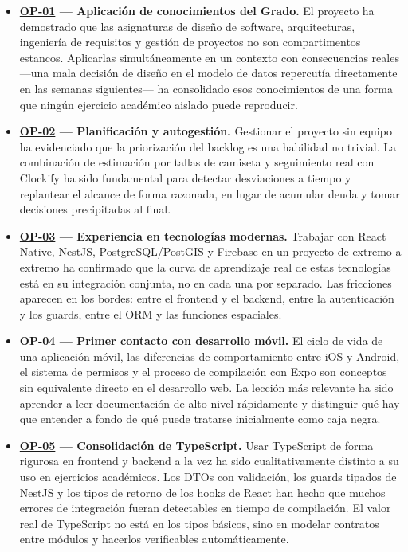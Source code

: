 \begin{itemize}
    \item \textbf{\hyperref[op:01]{OP-01} --- Aplicación de conocimientos del Grado.} El proyecto ha demostrado que las asignaturas de diseño de software, arquitecturas, ingeniería de requisitos y gestión de proyectos no son compartimentos estancos. Aplicarlas simultáneamente en un contexto con consecuencias reales ---una mala decisión de diseño en el modelo de datos repercutía directamente en las semanas siguientes--- ha consolidado esos conocimientos de una forma que ningún ejercicio académico aislado puede reproducir.

    \item \textbf{\hyperref[op:02]{OP-02} --- Planificación y autogestión.} Gestionar el proyecto sin equipo ha evidenciado que la priorización del backlog es una habilidad no trivial. La combinación de estimación por tallas de camiseta y seguimiento real con Clockify ha sido fundamental para detectar desviaciones a tiempo y replantear el alcance de forma razonada, en lugar de acumular deuda y tomar decisiones precipitadas al final.

    \item \textbf{\hyperref[op:03]{OP-03} --- Experiencia en tecnologías modernas.} Trabajar con React Native, NestJS, PostgreSQL/PostGIS y Firebase en un proyecto de extremo a extremo ha confirmado que la curva de aprendizaje real de estas tecnologías está en su integración conjunta, no en cada una por separado. Las fricciones aparecen en los bordes: entre el frontend y el backend, entre la autenticación y los guards, entre el ORM y las funciones espaciales.

    \item \textbf{\hyperref[op:04]{OP-04} --- Primer contacto con desarrollo móvil.} El ciclo de vida de una aplicación móvil, las diferencias de comportamiento entre iOS y Android, el sistema de permisos y el proceso de compilación con Expo son conceptos sin equivalente directo en el desarrollo web. La lección más relevante ha sido aprender a leer documentación de alto nivel rápidamente y distinguir qué hay que entender a fondo de qué puede tratarse inicialmente como caja negra.

    \item \textbf{\hyperref[op:05]{OP-05} --- Consolidación de TypeScript.} Usar TypeScript de forma rigurosa en frontend y backend a la vez ha sido cualitativamente distinto a su uso en ejercicios académicos. Los DTOs con validación, los guards tipados de NestJS y los tipos de retorno de los hooks de React han hecho que muchos errores de integración fueran detectables en tiempo de compilación. El valor real de TypeScript no está en los tipos básicos, sino en modelar contratos entre módulos y hacerlos verificables automáticamente.


\end{itemize}
